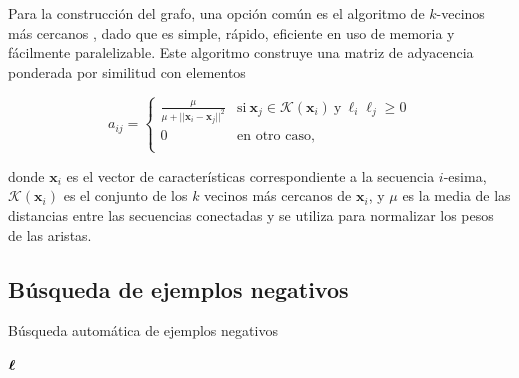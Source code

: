 Para la construcción del grafo, una opción común es el algoritmo de $k$-vecinos más cercanos \citep{eppstein1997nearest}, dado que es simple, rápido, eficiente en uso de
memoria y fácilmente paralelizable. Este algoritmo construye una matriz de adyacencia ponderada por similitud con elementos

\begin{equation}
	a_{ij} =
	\begin{cases}
		\frac{\mu}{\mu + ||\mathbf{x}_{i} - \mathbf{x}_{j}||^2} & \text{si} \ \mathbf{x}_{j} \in  \mathcal{K}(\mathbf{x}_{i}) \ \text{y} \ \ell_{i}
		\ell_{j} \geq 0 \\
		0 & \text{en otro caso,} \\
	\end{cases}
\end{equation}

\noindent donde $\mathbf{x}_{i}$ es el vector de características correspondiente a la secuencia $i$-esima, $\mathcal{K} (\mathbf{x}_{i})$ es el conjunto de los
$k$ vecinos más cercanos de $\mathbf{x}_{i}$, y $\mu$ es la media de las distancias entre las secuencias conectadas y se  utiliza para normalizar los pesos de
las aristas.

\subsection{Búsqueda de ejemplos negativos}

\renewcommand{\algorithmicrequire}{\textbf{Entrada:}}
\renewcommand{\algorithmicensure}{\textbf{Salida:}}
\renewcommand{\algorithmicrepeat}{\textbf{repetir}}
\renewcommand{\algorithmicuntil}{\textbf{mientras}}
\renewcommand{\algorithmicreturn}{\textbf{devolver}}
\begin{algorithm}[tpb]
	\caption{Búsqueda automática de ejemplos negativos}
	\label{algNS}
	\begin{algorithmic}[1]
		\REPEAT
		\RETURN $\boldsymbol\ell$
	\end{algorithmic}
\end{algorithm}

